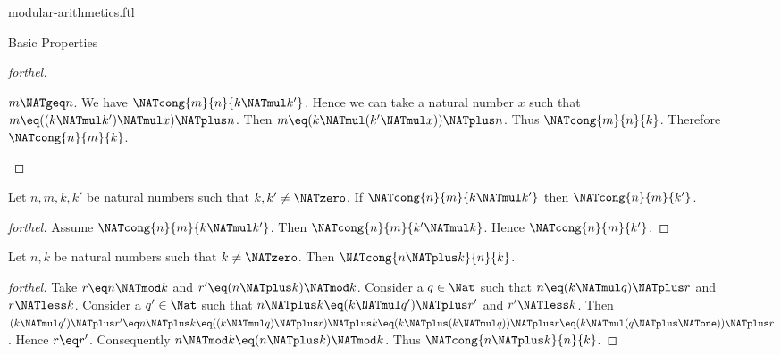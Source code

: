\documentclass{naproche-library}
\begin{document}
\begin{smodule}[title=Modular Arithmetics]{modular-arithmetics.ftl}
\begin{sfragment}{Basic Properties}
\begin{proof}[forthel]
    \begin{case}{$m \NATgeq n$.}
      We have $\NATcong{m}{n}{k \NATmul k'}$.
      Hence we can take a natural number $x$ such that $m \eq ((k \NATmul k') \NATmul x) \NATplus n$.
      Then $m \eq (k \NATmul (k' \NATmul x)) \NATplus n$.
      Thus $\NATcong{m}{n}{k}$.
      Therefore $\NATcong{n}{m}{k}$.
    \end{case}
  \end{proof}

  \begin{corollary}[forthel,id=ARITHMETIC_08_5895145169879040]
    Let $n, m, k, k'$ be natural numbers such that $k, k' \neq \NATzero$.
    If $\NATcong{n}{m}{k \NATmul k'}$ then $\NATcong{n}{m}{k'}$.
  \end{corollary}
  \begin{proof}[forthel]
    Assume $\NATcong{n}{m}{k \NATmul k'}$.
    Then $\NATcong{n}{m}{k' \NATmul k}$.
    Hence $\NATcong{n}{m}{k'}$.
  \end{proof}

  \begin{proposition}[forthel,id=ARITHMETIC_08_5984712287846400]
    Let $n, k$ be natural numbers such that $k \neq \NATzero$.
    Then $\NATcong{n \NATplus k}{n}{k}$.
  \end{proposition}
  \begin{proof}[forthel]
    Take $r \eq n \NATmod k$ and $r' \eq (n \NATplus k) \NATmod k$.
    Consider a $q \in \Nat$ such that $n \eq (k \NATmul q) \NATplus r$ and $r \NATless k$.
    Consider a $q' \in \Nat$ such that $n \NATplus k \eq (k \NATmul q') \NATplus r'$ and
    $r' \NATless k$.
    Then $(k \NATmul q') \NATplus r'
      \eq n \NATplus k
      \eq ((k \NATmul q) \NATplus r) \NATplus k
      \eq (k \NATplus (k \NATmul q)) \NATplus r
      \eq (k \NATmul (q \NATplus \NATone)) \NATplus r$.
    Hence $r \eq r'$.
    Consequently $n \NATmod k \eq (n \NATplus k) \NATmod k$.
    Thus $\NATcong{n \NATplus k}{n}{k}$.
  \end{proof}
\end{sfragment}
\end{smodule}
\end{document}
